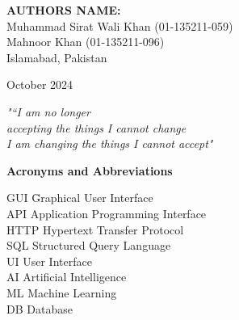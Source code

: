 \documentclass[12pt]{article}
\begin{document}
\vspace{1.5cm} %

\noindent
\textbf{AUTHORS NAME:} \\
Muhammad Sirat Wali Khan (01-135211-059) \\
Mahnoor Khan (01-135211-096) \\
Islamabad, Pakistan

\vspace{1cm}

\noindent
October 2024

\newpage
\setcounter{page}{2} %

\vspace*{9cm} %

\begin{flushright}
    \emph{"“I am no longer
    \\ accepting the things
    I cannot change
\\
    I am changing the things I cannot accept"}
    
    \vspace{1cm}

    \textbf{}
\end{flushright}
\newpage


\tableofcontents


\newpage
\listoffigures
\newpage

\listoftables




\newpage
\setcounter{page}{7} %
\pagestyle{plain} %

\vspace*{3cm} %

\begin{flushleft}
    \Large \textbf{Acronyms and Abbreviations}
\end{flushleft}

\vspace{1cm} %

\begin{tabbing}
    GUI \hspace{2cm} \= Graphical User Interface \\
    API \> Application Programming Interface \\
    HTTP \> Hypertext Transfer Protocol \\
    SQL \> Structured Query Language\\
    UI \> User Interface \\
    AI \> Artificial Intelligence \\
    ML \> Machine Learning\\
    DB \> Database \\
\end{tabbing}
\end{document}

